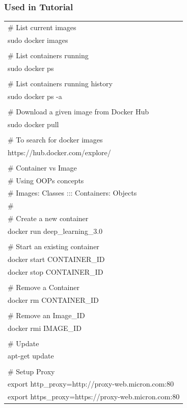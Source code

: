 \documentclass[a4paper]{article}
\begin{document}
\subsubsection{Used in Tutorial}
\tiny{\begin{tabular} { >{\ttfamily}l  }

\# List current images\\
sudo docker images\\
\\
\# List containers running\\
sudo docker ps\\
\\
\# List containers running history\\
sudo docker ps -a\\
\\
\# Download a given image from Docker Hub\\
sudo docker pull \\
\\
\# To search for docker images\\
https://hub.docker.com/explore/\\
\\
\# Container vs Image \\
\# Using OOPs concepts\\
\# Images: Classes ::: Containers: Objects\\
\#\\
\# Create a new container\\
docker run deep\_learning\_3.0\\
\\
\# Start an existing container\\
docker start CONTAINER\_ID\\
docker stop CONTAINER\_ID\\
\\
\# Remove a Container\\
docker rm CONTAINER\_ID\\
\\
\# Remove an Image\_ID\\
docker rmi IMAGE\_ID\\
\\
\# Update \\
apt-get update\\
\\
\# Setup Proxy\\
export http\_proxy=http://proxy-web.micron.com:80\\
export https\_proxy=https://proxy-web.micron.com:80\\

\end{tabular}}
\end{document}
